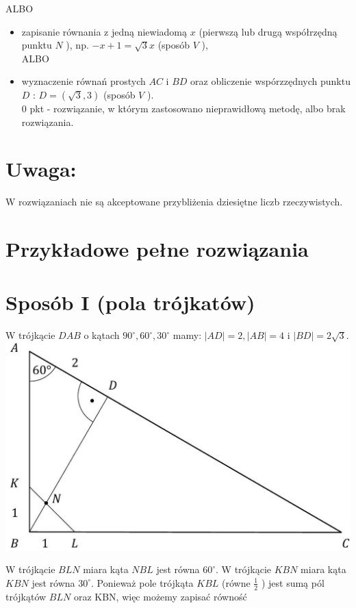 \documentclass[10pt]{article}
\begin{document}
ALBO

\begin{itemize}
  \item zapisanie równania z jedną niewiadomą $x$ (pierwszą lub drugą współrzędną punktu $N$ ), np. $-x+1=\sqrt{3} x$ (sposób $V$ ),\\
ALBO
  \item wyznaczenie równań prostych $A C$ i $B D$ oraz obliczenie wspórzzędnych punktu $D$ : $D=(\sqrt{3}, 3)$ (sposób $V$ ).\\
0 pkt - rozwiązanie, w którym zastosowano nieprawidłową metodę, albo brak rozwiązania.
\end{itemize}

\section*{Uwaga:}
W rozwiązaniach nie są akceptowane przybliżenia dziesiętne liczb rzeczywistych.

\section*{Przykładowe pełne rozwiązania}
\section*{Sposób I (pola trójkatów)}
W trójkącie $D A B$ o kątach $90^{\circ}, 60^{\circ}, 30^{\circ}$ mamy: $|A D|=2,|A B|=4$ i $|B D|=2 \sqrt{3}$.\\
\includegraphics[max width=\textwidth, center]{2025_02_07_dcb3d059df06a3930b0ag-08}

W trójkącie $B L N$ miara kąta $N B L$ jest równa $60^{\circ}$. W trójkącie $K B N$ miara kąta $K B N$ jest równa $30^{\circ}$. Ponieważ pole trójkąta $K B L$ (równe $\frac{1}{2}$ ) jest sumą pól trójkątów $B L N$ oraz KBN, więc możemy zapisać równość
\end{document}
